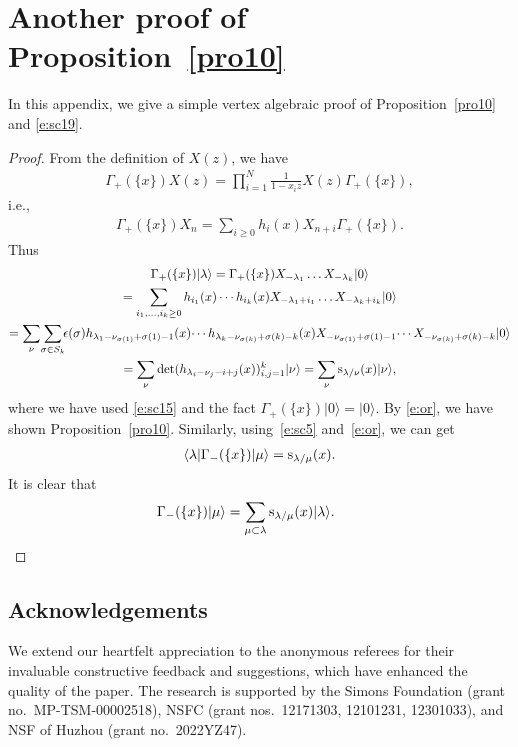 \documentclass[pdftex]{sigma}
\numberwithin{equation}{section}
\begin{document}
\section{Another proof of Proposition~\ref{pro10}}\label{appA}
In this appendix, we give a simple vertex algebraic proof of Proposition~\ref{pro10} and \eqref{e:sc19}.
\begin{proof}
From the definition of $X(z)$, we have
\begin{align*}
\Gamma_+(\{x\})X(z)=\prod^N_{i=1}\frac{1}{1-x_iz}X(z)\Gamma_+(\{x\}),
\end{align*}
i.e.,
\begin{align*}
\Gamma_+(\{x\})X_n=\sum_{i\geq 0}h_i(x)X_{n+i}\Gamma_+(\{x\}).
\end{align*}
Thus
\begin{gather*}
\Gamma_+(\{x\})|\lambda\rangle
 =\Gamma_+(\{x\})X_{-\lambda_1}\dots X_{-\lambda_k}|0\rangle\\
 =\sum_{i_1,\dots,i_k\geq 0}h_{i_1}(x)\cdots h_{i_k}(x)X_{-\lambda_1+i_1}\dots X_{-\lambda_k+i_k}|0\rangle
\\
= \sum_{\nu}\!\sum_{\sigma\in S_k}\!\!\epsilon(\sigma)h_{\lambda_1-\nu_{\sigma(1)}+\sigma(1)-1}(x)\!\cdots h_{\lambda_k-\nu_{\sigma(k)}+\sigma(k)-k}(x)X_{-\nu_{\sigma(1)}+\sigma(1)-1}\!\cdots X_{-\nu_{\sigma(k)}+\sigma(k)-k}|0\rangle\\
= \sum_{\nu}\det(h_{\lambda_i-\nu_j-i+j}(x))^k_{i,j=1}|\nu\rangle = \sum_{\nu}{\rm s}_{\lambda/\nu}(x)|\nu\rangle,
\end{gather*}
where we have used \eqref{e:sc15} and the fact $\Gamma_+(\{x\})|0\rangle=|0\rangle$. By \eqref{e:or}, we have shown Proposition~\ref{pro10}. Similarly, using~\eqref{e:sc5} and~\eqref{e:or}, we can get
\begin{align*}
\langle\lambda|\Gamma_-(\{x\})|\mu\rangle = {\rm s}_{\lambda/\mu}(x).
\end{align*}
It is clear that
\begin{align*}
\Gamma_-(\{x\})|\mu\rangle = \sum_{\mu\subset \lambda}{\rm s}_{\lambda/\mu}(x)|\lambda\rangle.\tag*{\qed}
\end{align*}\renewcommand{\qed}{}
\end{proof}

\subsection*{Acknowledgements}

We extend our heartfelt appreciation to the anonymous referees for their invaluable constructive feedback and suggestions, which have enhanced the quality of the paper.
The research is supported by the Simons Foundation (grant no.\ MP-TSM-00002518), NSFC (grant nos.\ 12171303, 12101231, 12301033), and NSF of Huzhou (grant no.\ 2022YZ47).
\end{document}
